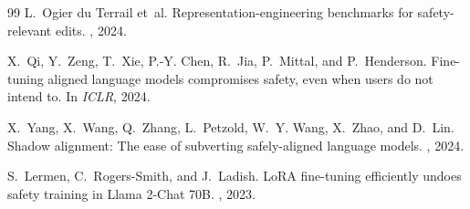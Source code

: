 \documentclass{article}
\begin{document}
\begin{thebibliography}{99}
L.~Ogier du Terrail et~al.
\newblock Representation-engineering benchmarks for safety-relevant edits.
, 2024.

X.~Qi, Y.~Zeng, T.~Xie, P.-Y. Chen, R.~Jia, P.~Mittal, and P.~Henderson.
\newblock Fine-tuning aligned language models compromises safety, even when
  users do not intend to.
\newblock In {\em ICLR}, 2024.

X.~Yang, X.~Wang, Q.~Zhang, L.~Petzold, W.~Y. Wang, X.~Zhao, and D.~Lin.
\newblock Shadow alignment: The ease of subverting safely-aligned language
  models.
, 2024.

S.~Lermen, C.~Rogers-Smith, and J.~Ladish.
\newblock LoRA fine-tuning efficiently undoes safety training in Llama 2-Chat
  70B.
, 2023.

\end{thebibliography}
\end{document}
